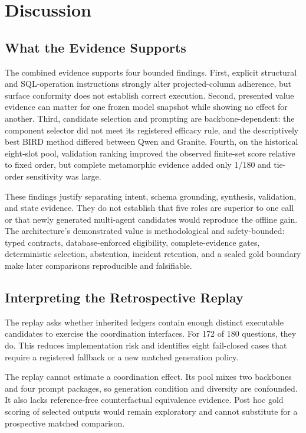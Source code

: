\documentclass[applsci,article,submit,moreauthors]{Definitions/mdpi}
\begin{document}
\section{Discussion}

\subsection{What the Evidence Supports}

The combined evidence supports four bounded findings. First, explicit structural and SQL-operation instructions strongly alter projected-column adherence, but surface conformity does not establish correct execution. Second, presented value evidence can matter for one frozen model snapshot while showing no effect for another. Third, candidate selection and prompting are backbone-dependent: the component selector did not meet its registered efficacy rule, and the descriptively best BIRD method differed between Qwen and Granite. Fourth, on the historical eight-slot pool, validation ranking improved the observed finite-set score relative to fixed order, but complete metamorphic evidence added only 1/180 and tie-order sensitivity was large.

These findings justify separating intent, schema grounding, synthesis, validation, and state evidence. They do not establish that five roles are superior to one call or that newly generated multi-agent candidates would reproduce the offline gain. The architecture's demonstrated value is methodological and safety-bounded: typed contracts, database-enforced eligibility, complete-evidence gates, deterministic selection, abstention, incident retention, and a sealed gold boundary make later comparisons reproducible and falsifiable.

\subsection{Interpreting the Retrospective Replay}

The replay asks whether inherited ledgers contain enough distinct executable candidates to exercise the coordination interfaces. For 172 of 180 questions, they do. This reduces implementation risk and identifies eight fail-closed cases that require a registered fallback or a new matched generation policy.

The replay cannot estimate a coordination effect. Its pool mixes two backbones and four prompt packages, so generation condition and diversity are confounded. It also lacks reference-free counterfactual equivalence evidence. Post hoc gold scoring of selected outputs would remain exploratory and cannot substitute for a prospective matched comparison.
\end{document}
